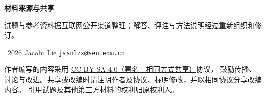 \par\bigskip
\begingroup
\small\color{syn-muted-text}
\setlength{\parindent}{0pt}
\textbf{材料来源与共享}\par\smallskip
试题与参考资料据互联网公开渠道整理；解答、评注与方法说明经过重新组织和修订。\par\smallskip
\textcopyright\ 2026 Jacobi Lie\quad
\href{mailto:jssnlzx@seu.edu.cn}{\nolinkurl{jssnlzx@seu.edu.cn}}\par\smallskip
作者编写的内容采用
\href{https://creativecommons.org/licenses/by-sa/4.0/}{CC BY-SA 4.0（署名—相同方式共享）}协议，
鼓励传播、讨论与改进。共享或改编时请注明作者及协议、标明修改，并以相同协议分享改编内容。
引用试题及其他第三方材料的权利归原权利人。\par
\endgroup
